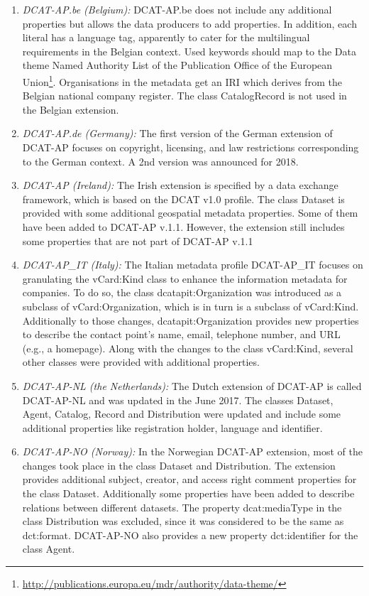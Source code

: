 \documentclass[<options>]{elsarticle}
\begin{document}
\begin{enumerate}
\item \textit{DCAT-AP.be (Belgium):} DCAT-AP.be does not include any additional properties but allows the data producers to add properties. In addition, each literal has a language tag, apparently to cater for the multilingual requirements in the Belgian context. Used keywords should map to the Data theme Named Authority List of the Publication Office of the European Union\footnote{\href{   http://publications.europa.eu/mdr/authority/data-theme/}{http://publications.europa.eu/mdr/authority/data-theme/}}. Organisations in the metadata get an IRI which derives from the Belgian national company register. The class CatalogRecord is not used in the Belgian extension.

\item \textit{DCAT-AP.de (Germany):} The first version of the German extension of DCAT-AP focuses on copyright, licensing, and law restrictions corresponding to the German context. A 2nd version was announced for 2018.

\item \textit{DCAT-AP (Ireland): }The Irish extension is specified by a data exchange framework, which is based on the DCAT v1.0 profile. The class Dataset is provided with some additional geospatial metadata properties. Some of them have been added to DCAT-AP v.1.1. However, the extension still includes some properties that are not part of DCAT-AP v.1.1

\item \textit{DCAT-AP\_IT (Italy):} The Italian metadata profile DCAT-AP\_IT focuses on granulating the vCard:Kind class to enhance the information metadata for companies. To do so, the class dcatapit:Organization was introduced as a subclass of vCard:Organization, which is in turn is a subclass of vCard:Kind. Additionally to those changes, dcatapit:Organization provides new properties to describe the contact point’s name, email,  telephone number, and URL (e.g., a homepage). Along with the changes to the class vCard:Kind, several other classes were provided with additional properties.

\item \textit{DCAT-AP-NL (the Netherlands): }The Dutch extension of DCAT-AP is called DCAT-AP-NL and was updated in the June 2017. The classes Dataset, Agent, Catalog, Record and Distribution were updated and include some additional properties like registration holder, language and identifier. 

\item \textit{DCAT-AP-NO (Norway):} In the Norwegian DCAT-AP extension, most of the changes took place in the class Dataset and Distribution. The extension provides additional subject, creator, and access right comment properties for the class Dataset. Additionally some properties have been added to describe relations between different datasets. The property dcat:mediaType in the class Distribution was excluded, since it was considered to be the same as dct:format. DCAT-AP-NO also provides a new property dct:identifier for the class Agent.


\end{enumerate}
\end{document}
